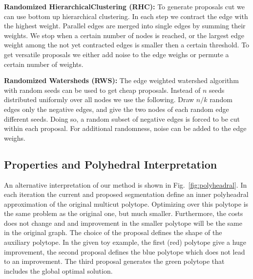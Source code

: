 \documentclass[10pt,twocolumn,letterpaper]{article}
\begin{document}
\noindent \textbf{Randomized HierarchicalClustering (RHC):}
%
To generate proposals cut we can use bottom up hierarchical clustering.
In each step we contract the edge with the highest weight.
Parallel edges are merged into single edges by summing their weights.
We stop when a certain number of nodes is reached, or the
largest edge weight among the not yet contracted edges is smaller then a certain threshold.
To get versatile proposals we either add noise 
to the edge weighs or permute a certain number of weights.


%

\noindent \textbf{Randomized Watersheds (RWS):}
%
The edge weighted watershed algorithm \cite{meyer_2013}
with random seeds can be used to get 
cheap proposals. Instead of $n$ seeds distributed uniformly
over all nodes we use the following.
Draw $n/k$ random edges only the negative edges, 
and give the two nodes of each random edge different seeds.
Doing so, a random subset of negative edges is forced
to be cut within each proposal.
For additional randomness, noise can be added to
the edge weighs.



%

\subsection{Properties and Polyhedral Interpretation}
An alternative interpretation of our method is shown in Fig.~\ref{fig:polyheadral}.
In each iteration the current and proposed segmentation define an inner polyheadral 
approximation of the original multicut polytope. 
Optimizing over this polytope is the same problem as the original one, but much smaller.
Furthermore, the costs does not change and and improvement in the smaller polytope will 
be the same in the original graph.
The choice of the proposal defines the shape of the auxiliary polytope. 
In the given toy example, the first (red) polytope give a huge improvement, the second proposal
defines the blue polytope which does not lead to an improvement. 
The third proposal generates the green polytope that includes the global optimal solution.
\end{document}
